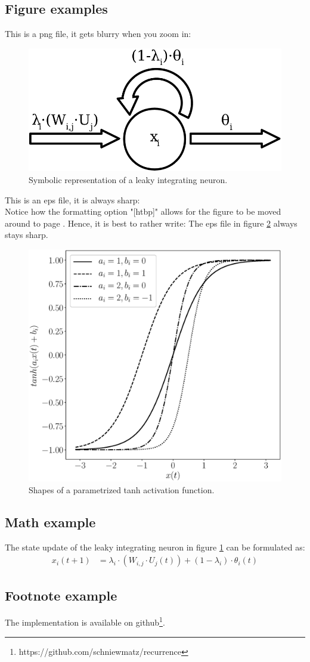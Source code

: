 \subsection{Figure examples}
This is a png file, it gets blurry when you zoom in:
\begin{figure}[htbp]
    \centering
    \includegraphics[width=.7\textwidth]{figures/leaky_integration.png}
    \caption{Symbolic representation of a leaky integrating neuron.}
    \label{fig:leaky_integration}
\end{figure}

This is an eps file, it is always sharp:\\
Notice how the formatting option "[htbp]" allows for the figure to be moved around to page \pageref{fig:activation_function}. Hence, it is best to rather write: The eps file in figure \ref{fig:activation_function} always stays sharp.
\begin{figure}[htbp]
    \centering
    \includegraphics[width=.7\textwidth]{figures/activation_functions}
    \caption{Shapes of a parametrized tanh activation function.}
    \label{fig:activation_function}
\end{figure}

\subsection{Math example}
The state update of the leaky integrating neuron in figure \ref{fig:leaky_integration} can be formulated as:
\begin{align}
    x_i(t+1) &= \lambda_i \cdot \left(W_{i,j} \cdot U_j(t)\right) + (1-\lambda_i) \cdot \theta_i(t)
    \label{eq:leaky_integration}
\end{align}

\subsection{Footnote example}
The implementation is available on github\footnote{https://github.com/schniewmatz/recurrence}.